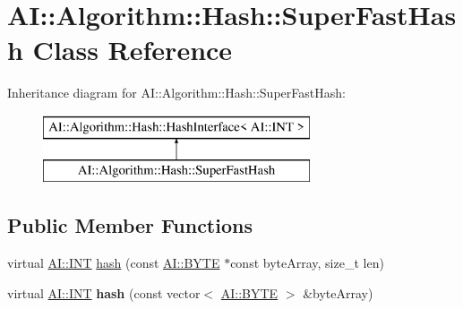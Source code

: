 \hypertarget{classAI_1_1Algorithm_1_1Hash_1_1SuperFastHash}{\section{A\-I\-:\-:Algorithm\-:\-:Hash\-:\-:Super\-Fast\-Hash Class Reference}
\label{classAI_1_1Algorithm_1_1Hash_1_1SuperFastHash}
}
Inheritance diagram for A\-I\-:\-:Algorithm\-:\-:Hash\-:\-:Super\-Fast\-Hash\-:\begin{figure}[H]
\begin{center}
\leavevmode
\includegraphics[height=2.000000cm]{classAI_1_1Algorithm_1_1Hash_1_1SuperFastHash}
\end{center}
\end{figure}
\subsection*{Public Member Functions}
\begin{DoxyCompactItemize}
\item 
virtual \hyperlink{namespaceAI_ac74584e573f07aa4194b461b1ba7be64}{A\-I\-::\-I\-N\-T} \hyperlink{classAI_1_1Algorithm_1_1Hash_1_1SuperFastHash_a242ccb7975bd45b30a945d9649170629}{hash} (const \hyperlink{namespaceAI_a9d4bcda82fe0f9aac3c4861e24491581}{A\-I\-::\-B\-Y\-T\-E} $\ast$const byte\-Array, size\-\_\-t len)
\item 
\hypertarget{classAI_1_1Algorithm_1_1Hash_1_1SuperFastHash_a08a5db31d857cc7706529d185827586a}{virtual \hyperlink{namespaceAI_ac74584e573f07aa4194b461b1ba7be64}{A\-I\-::\-I\-N\-T} {\bfseries hash} (const vector$<$ \hyperlink{namespaceAI_a9d4bcda82fe0f9aac3c4861e24491581}{A\-I\-::\-B\-Y\-T\-E} $>$ \&byte\-Array)}\label{classAI_1_1Algorithm_1_1Hash_1_1SuperFastHash_a08a5db31d857cc7706529d185827586a}

\end{DoxyCompactItemize}


